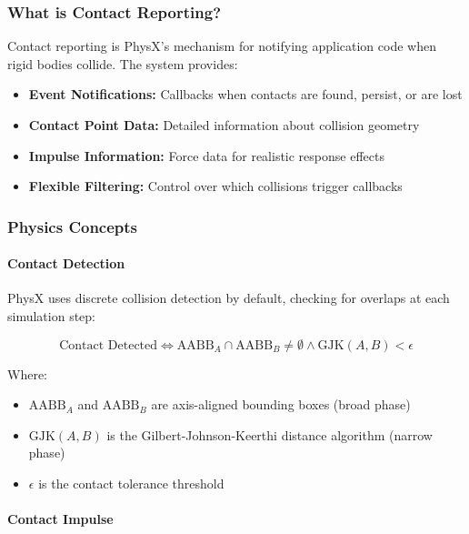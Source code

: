 \subsubsection{What is Contact Reporting?}

Contact reporting is PhysX's mechanism for notifying application code when rigid bodies collide. The system provides:

\begin{itemize}
    \item \textbf{Event Notifications:} Callbacks when contacts are found, persist, or are lost
    \item \textbf{Contact Point Data:} Detailed information about collision geometry
    \item \textbf{Impulse Information:} Force data for realistic response effects
    \item \textbf{Flexible Filtering:} Control over which collisions trigger callbacks
\end{itemize}

\subsubsection{Physics Concepts}

\paragraph{Contact Detection}

PhysX uses discrete collision detection by default, checking for overlaps at each simulation step:

\begin{equation}
\text{Contact Detected} \iff \text{AABB}_A \cap \text{AABB}_B \neq \emptyset \land \text{GJK}(A, B) < \epsilon
\end{equation}

Where:
\begin{itemize}
    \item $\text{AABB}_A$ and $\text{AABB}_B$ are axis-aligned bounding boxes (broad phase)
    \item $\text{GJK}(A, B)$ is the Gilbert-Johnson-Keerthi distance algorithm (narrow phase)
    \item $\epsilon$ is the contact tolerance threshold
\end{itemize}

\paragraph{Contact Impulse}

